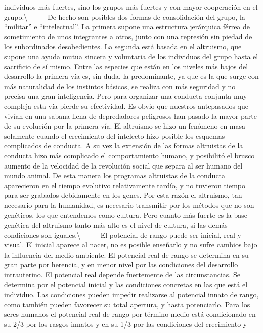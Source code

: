 individuos más fuertes, sino los grupos más fuertes y con mayor
cooperación en el grupo.\textbackslash{} ~ ~ ~ De hecho son posibles dos
formas de consolidación del grupo, la ``militar'' e ``intelectual''. La
primera supone una estructura jerárquica férrea de sometimiento de unos
integrantes a otros, junto con una represión sin piedad de los
subordinados desobedientes. La segunda está basada en el altruismo, que
supone una ayuda mutua sincera y voluntaria de los individuos del grupo
hasta el sacrificio de sí mismo. Entre las especies que están en los
niveles más bajos del desarrollo la primera vía es, sin duda, la
predominante, ya que es la que surge con más naturalidad de los
instintos básicos, se realiza con más seguridad y no precisa una gran
inteligencia. Pero para organizar una conducta conjunta muy compleja
esta vía pierde su efectividad. Es obvio que nuestros antepasados que
vivían en una sabana llena de depredadores peligrosos han pasado la
mayor parte de su evolución por la primera vía. El altruismo se hizo un
fenómeno en masa solamente cuando el crecimiento del intelecto hizo
posible los esquemas complicados de conducta. A su vez la extensión de
las formas altruistas de la conducta hizo más complicado el
comportamiento humano, y posibilitó el brusco aumento de la velocidad de
la revolución social que separa al ser humano del mundo animal. De esta
manera los programas altruistas de la conducta aparecieron en el tiempo
evolutivo relativamente tardío, y no tuvieron tiempo para ser grabados
debidamente en los genes. Por esta razón el altruismo, tan necesario
para la humanidad, es necesario transmitir por los métodos que no son
genéticos, los que entendemos como cultura. Pero cuanto más fuerte es la
base genética del altruismo tanto más alto es el nivel de cultura, si
las demás condiciones son iguales.\textbackslash{} ~ ~ ~ El potencial de
rango puede ser inicial, real y visual. El inicial aparece al nacer, no
es posible enseñarlo y no sufre cambios bajo la influencia del medio
ambiente. El potencial real de rango se determina en su gran parte por
herencia, y en menor nivel por las condiciones del desarrollo
intrauterino. El potencial real depende fuertemente de las
circunstancias. Se determina por el potencial inicial y las condiciones
concretas en las que está el individuo. Las condiciones pueden impedir
realizarse al potencial innato de rango, como también pueden favorecer
su total apertura, y hasta potenciarlo. Para los seres humanos el
potencial real de rango por término medio está condicionado en su 2/3
por los rasgos innatos y en su 1/3 por las condiciones del crecimiento y
